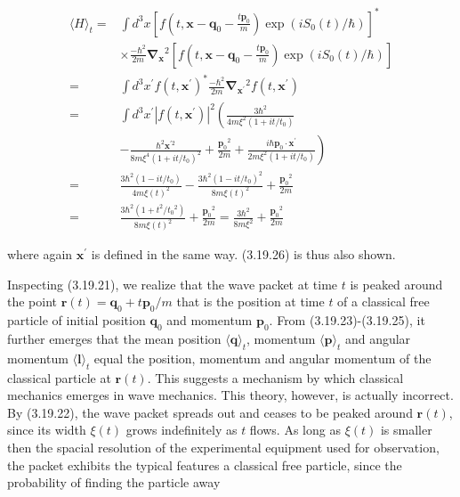 \documentclass{article}
\begin{document}
\begin{align*}
\langle H\rangle_{t}= & \int d^{3} x\left[f\left(t, \boldsymbol{x}-\boldsymbol{q}_{0}-\frac{t \boldsymbol{p}_{0}}{m}\right) \exp \left(i S_{0}(t) / \hbar\right)\right]^{*}  \tag{3.19.40}\\
& \times \frac{-\hbar^{2}}{2 m} \boldsymbol{\nabla}_{\boldsymbol{x}}{ }^{2}\left[f\left(t, \boldsymbol{x}-\boldsymbol{q}_{0}-\frac{t \boldsymbol{p}_{0}}{m}\right) \exp \left(i S_{0}(t) / \hbar\right)\right] \\
= & \int d^{3} x^{\prime} f\left(t, \boldsymbol{x}^{\prime}\right)^{*} \frac{-\hbar^{2}}{2 m} \boldsymbol{\nabla}_{\boldsymbol{x}^{\prime}}{ }^{2} f\left(t, \boldsymbol{x}^{\prime}\right) \\
= & \int d^{3} x^{\prime}\left|f\left(t, \boldsymbol{x}^{\prime}\right)\right|^{2}\left(\frac{3 \hbar^{2}}{4 m \xi^{2}\left(1+i t / t_{0}\right)}\right. \\
& \left.-\frac{\hbar^{2} \boldsymbol{x}^{\prime 2}}{8 m \xi^{4}\left(1+i t / t_{0}\right)^{2}}+\frac{\boldsymbol{p}_{0}{ }^{2}}{2 m}+\frac{i \hbar \boldsymbol{p}_{0} \cdot \boldsymbol{x}^{\prime}}{2 m \xi^{2}\left(1+i t / t_{0}\right)}\right) \\
= & \frac{3 \hbar^{2}\left(1-i t / t_{0}\right)}{4 m \xi(t)^{2}}-\frac{3 \hbar^{2}\left(1-i t / t_{0}\right)^{2}}{8 m \xi(t)^{2}}+\frac{\boldsymbol{p}_{0}{ }^{2}}{2 m} \\
= & \frac{3 \hbar^{2}\left(1+t^{2} / t_{0}{ }^{2}\right)}{8 m \xi(t)^{2}}+\frac{\boldsymbol{p}_{0}{ }^{2}}{2 m}=\frac{3 \hbar^{2}}{8 m \xi^{2}}+\frac{\boldsymbol{p}_{0}{ }^{2}}{2 m}
\end{align*}
 
where again $\boldsymbol{x}^{\prime}$ is defined in the same way. (3.19.26) is thus also shown.

Inspecting (3.19.21), we realize that the wave packet at time $t$ is peaked around the point $\boldsymbol{r}(t)=\boldsymbol{q}_{0}+t \boldsymbol{p}_{0} / m$ that is the position at time $t$ of a classical free particle of initial position $\boldsymbol{q}_{0}$ and momentum $\boldsymbol{p}_{0}$. From (3.19.23)-(3.19.25), it further emerges that the mean position $\langle\boldsymbol{q}\rangle_{t}$, momentum $\langle\boldsymbol{p}\rangle_{t}$ and angular momentum $\langle\boldsymbol{l}\rangle_{t}$ equal the position, momentum and angular momentum of the classical particle at $\boldsymbol{r}(t)$. This suggests a mechanism by which classical mechanics emerges in wave mechanics. This theory, however, is actually incorrect. By (3.19.22), the wave packet spreads out and ceases to be peaked around $\boldsymbol{r}(t)$, since its width $\xi(t)$ grows indefinitely as $t$ flows. As long as $\xi(t)$ is smaller then the spacial resolution of the experimental equipment used for observation, the packet exhibits the typical features a classical free particle, since the probability of finding the particle away
\end{document}
